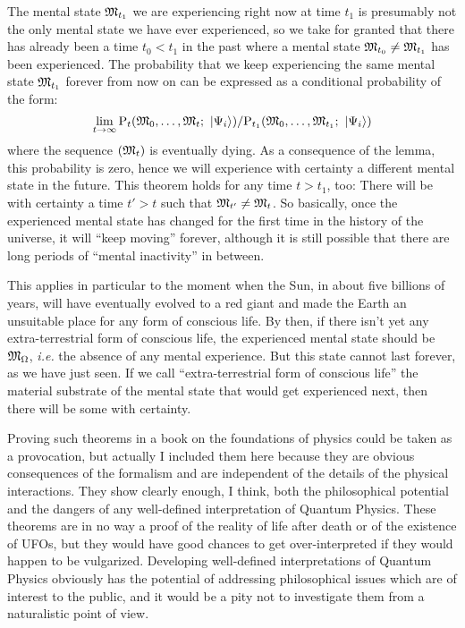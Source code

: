  The mental state $\mathfrak{M}_{t_1}$ we are experiencing right now at time $t_1$ is presumably not the only mental state we have ever experienced, so we take for granted that there has already been a time $t_0 < t_1$ in the past where a mental state $\mathfrak{M}_{t_0} \neq \mathfrak{M}_{t_1}$ has been experienced. The probability that we keep experiencing the same mental state $\mathfrak{M}_{t_1}$ forever from now on can be expressed as a conditional probability of the form:
\begin{equation*}
\lim_{t \to \infty} \mathrm P_t(\mathfrak{M}_0, \dotsc, \mathfrak{M}_t; \ \left|{\Psi_i}\right\rangle) / \mathrm P_{t_1}(\mathfrak{M}_0, \dotsc, \mathfrak{M}_{t_1}; \ \left|{\Psi_i}\right\rangle)
\end{equation*}
where the sequence $(\mathfrak{M}_t)$ is eventually dying. As a consequence of the lemma, this probability is zero, hence we will experience with certainty a different mental state in the future. This theorem holds for any time $t > t_1$, too: There will be with certainty a time $t' > t$ such that $\mathfrak{M}_{t'} \neq \mathfrak{M}_t$. So basically, once the experienced mental state has changed for the first time in the history of the universe, it will ``keep moving'' forever, although it is still possible that there are long periods of ``mental inactivity'' in between.

This applies in particular to the moment when the Sun, in about five billions of years, will have eventually evolved to a red giant and made the Earth an unsuitable place for any form of conscious life. By then, if there isn't yet any extra-terrestrial form of conscious life, the experienced mental state should be $\mathfrak{M}_\Omega$, \textit{i.e.} the absence of any mental experience. But this state cannot last forever, as we have just seen. If we call ``extra-terrestrial form of conscious life'' the material substrate of the mental state that would get experienced next, then there will be some with certainty.

 Proving such theorems in a book on the foundations of physics could be taken as a provocation, but actually I included them here because they are obvious consequences of the formalism and are independent of the details of the physical interactions. They show clearly enough, I think, both the philosophical potential and the dangers of any well-defined interpretation of Quantum Physics. These theorems are in no way a proof of the reality of life after death or of the existence of UFOs, but they would have good chances to get over-interpreted if they would happen to be vulgarized. Developing well-defined interpretations of Quantum Physics obviously has the potential of addressing philosophical issues which are of interest to the public, and it would be a pity not to investigate them from a naturalistic point of view.

